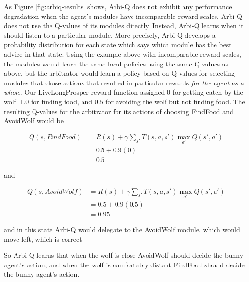 As Figure \ref{fig:arbiq-results} shows, Arbi-Q does not exhibit any performance degradation when the agent's modules have incomparable reward scales. Arbi-Q does not use the Q-values of its modules directly. Instead, Arbi-Q learns when it should listen to a particular module. More precisely, Arbi-Q develops a probability distribution for each state which says which module has the best advice in that state. Using the example above with incomparable reward scales, the modules would learn the same local policies using the same Q-values as above, but the arbitrator would learn a policy based on Q-values for selecting modules that chose actions that resulted in particular rewards {\it for the agent as a whole}. Our LiveLongProsper reward function assigned 0 for getting eaten by the wolf, 1.0 for finding food, and 0.5 for avoiding the wolf but not finding food. The resulting Q-values for the arbitrator for its actions of choosing FindFood and AvoidWolf would be

\begin{align*}
Q(s, FindFood) &= R(s) + \gamma \sum_{s'} T(s, a, s') \max_{a'} Q(s', a')\\
               &= 0.5 + 0.9 (0)\\
               &= 0.5
\end{align*}

and

\begin{align*}
Q(s, AvoidWolf) &= R(s) + \gamma \sum_{s'} T(s, a, s') \max_{a'} Q(s', a')\\
                &= 0.5 + 0.9 (0.5)\\
                &= 0.95
\end{align*}

and in this state Arbi-Q would delegate to the AvoidWolf module, which would move left, which is correct.

So Arbi-Q learns that when the wolf is close AvoidWolf should decide the bunny agent's action, and when the wolf is comfortably distant FindFood should decide the bunny agent's action.





